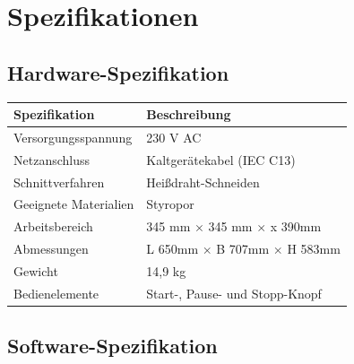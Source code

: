 %
%

\chapter{Spezifikationen}

\section{Hardware-Spezifikation}

\renewcommand{\arraystretch}{1.4}

\begin{table}[ht]
	\centering
	\begin{tabular}{|p{6cm}|p{8cm}|}
		\hline
		\textbf{Spezifikation} & \textbf{Beschreibung} \\ \hline
		
		Versorgungsspannung & 230 V AC \\ \hline
		
		Netzanschluss & Kaltgerätekabel (IEC C13) \\ \hline
		
		Schnittverfahren & Heißdraht-Schneiden \\ \hline
		
		Geeignete Materialien & Styropor \\ \hline
		
		Arbeitsbereich & 345 mm $\times$ 345 mm $\times$ x 390mm \\ \hline
		
		Abmessungen & L 650mm $\times$ B 707mm $\times$ H 583mm \\ \hline
		
		Gewicht & 14,9 kg \\ \hline
		
		Bedienelemente & Start-, Pause- und Stopp-Knopf \\ \hline
		
	\end{tabular}
\end{table}

\section{Software-Spezifikation}

\renewcommand{\arraystretch}{1.4}

